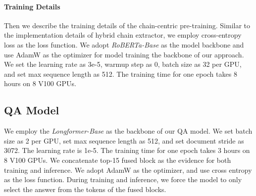 \documentclass[11pt]{article}
\begin{document}
\paragraph{Training Details}

Then we describe the training details of the chain-centric pre-training. 
Similar to the implementation details of hybrid chain extractor, we employ cross-entropy loss as the
loss function. 
We adopt \textit{RoBERTa-Base} \cite{Liu2019RoBERTaAR} as the model backbone and use AdamW as the optimizer for model training
the backbone of our approach. We set the learning rate as 3e-5, warmup
step as 0, batch size as 32 per GPU, and set max sequence
length as 512. The training time for one
epoch takes 8 hours on 8 V100 GPUs.
\subsection{QA Model}
We employ the \textit{Longformer-Base} \cite{beltagy2020longformer} as the backbone of our QA model. We set batch size as 2 per GPU, set max sequence length as 512, and set document stride as 3072. The learning rate is 1e-5. The training time for one
epoch takes 3 hours on 8 V100 GPUs.
We concatenate top-15 fused block as the evidence for both training and inference. We adopt AdamW as the optimizer, and use cross entropy as the loss function. During training and inference, we force the model to only select the answer from the tokens of the fused blocks. 

	
\end{document}
